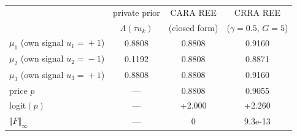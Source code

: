 \documentclass[border=2pt]{standalone}
\begin{document}
\begin{tabular}{lccc}
\toprule
  & private prior  &  CARA REE  &  CRRA REE \\
  &  $\Lambda(\tau u_k)$  &  (closed form)  &  ($\gamma\!=\!0.5$, $G\!=\!5$) \\
\midrule
  $\mu_1$ (own signal $u_1\!=\!+1$)  &  0.8808  &  0.8808  &  0.9160 \\
  $\mu_2$ (own signal $u_2\!=\!-1$)  &  0.1192  &  0.8808  &  0.8871 \\
  $\mu_3$ (own signal $u_3\!=\!+1$)  &  0.8808  &  0.8808  &  0.9160 \\
  price $p$  &  ---  &  0.8808  &  0.9055 \\
  logit$(p)$  &  ---  &  +2.000  &  +2.260 \\
  $\Vert F\Vert_\infty$  &  ---  &  $0$  &  9.3e-13 \\
\bottomrule
\end{tabular}
\end{document}
